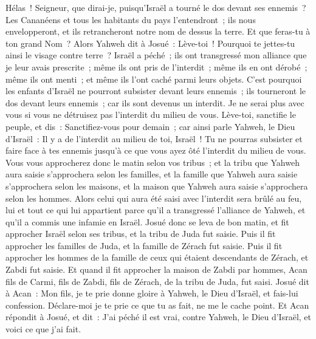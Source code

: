 \begin{multicols}{2}
Hélas~! Seigneur, que dirai-je, puisqu'Israël a tourné le dos devant ses ennemis~?
Les Cananéens et tous les habitants du pays l'entendront~; ils nous envelopperont, et ils retrancheront notre nom de dessus la terre. Et que feras-tu à ton grand Nom~?
Alors Yahweh dit à Josué~: Lève-toi~! Pourquoi te jettes-tu ainsi le visage contre terre~?
Israël a péché~; ils ont transgressé mon alliance que je leur avais prescrite~; même ils ont pris de l'interdit~; même ils en ont dérobé~; même ils ont menti~; et même ils l'ont caché parmi leurs objets.
C'est pourquoi les enfants d'Israël ne pourront subsister devant leurs ennemis~; ils tourneront le dos devant leurs ennemis~; car ils sont devenus un interdit. Je ne serai plus avec vous si vous ne détruisez pas l'interdit du milieu de vous.
Lève-toi, sanctifie le peuple, et dis~: Sanctifiez-vous pour demain~; car ainsi parle Yahweh, le Dieu d'Israël~: Il y a de l'interdit au milieu de toi, Israël~! Tu ne pourras subsister et faire face à tes ennemis jusqu'à ce que vous ayez ôté l'interdit du milieu de vous.
Vous vous approcherez donc le matin selon vos tribus~; et la tribu que Yahweh aura saisie s'approchera selon les familles, et la famille que Yahweh aura saisie s'approchera selon les maisons, et la maison que Yahweh aura saisie s'approchera selon les hommes.
Alors celui qui aura été saisi avec l'interdit sera brûlé au feu, lui et tout ce qui lui appartient parce qu'il a transgressé l'alliance de Yahweh, et qu'il a commis une infamie en Israël.
Josué donc se leva de bon matin, et fit approcher Israël selon ses tribus, et la tribu de Juda fut saisie.
Puis il fit approcher les familles de Juda, et la famille de Zérach fut saisie. Puis il fit approcher les hommes de la famille de ceux qui étaient descendants de Zérach, et Zabdi fut saisie.
Et quand il fit approcher la maison de Zabdi par hommes, Acan fils de Carmi, fils de Zabdi, fils de Zérach, de la tribu de Juda, fut saisi.
Josué dit à Acan~: Mon fils, je te prie donne gloire à Yahweh, le Dieu d'Israël, et fais-lui confession. Déclare-moi je te prie ce que tu as fait, ne me le cache point.
Et Acan répondit à Josué, et dit~: J'ai péché il est vrai, contre Yahweh, le Dieu d'Israël, et voici ce que j'ai fait.

\end{multicols}
